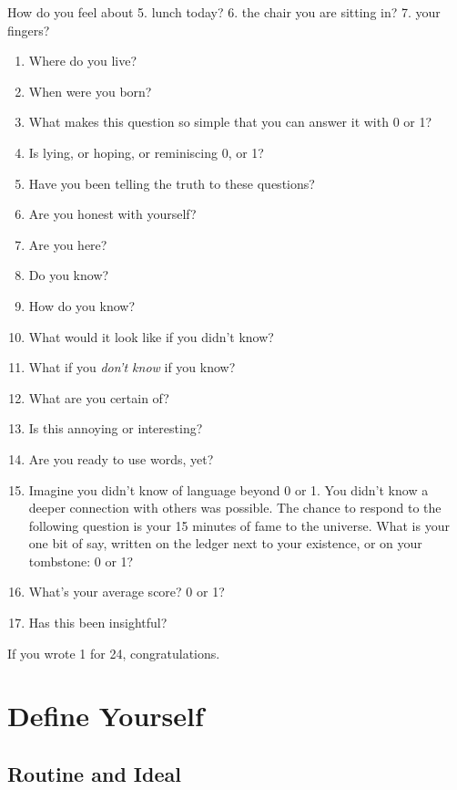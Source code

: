 \documentclass[
]{book}
\begin{document}
How do you feel about
5. lunch today?
6. the chair you are sitting in?
7. your fingers?

\begin{enumerate}
\def\labelenumi{\arabic{enumi}.}
\setcounter{enumi}{7}
\item
  Where do you live?
\item
  When were you born?
\item
  What makes this question so simple that you can answer it
  with 0 or 1?
\item
  Is lying, or hoping, or reminiscing 0, or 1?
\item
  Have you been telling the truth to these questions?
\item
  Are you honest with yourself?
\item
  Are you here?
\item
  Do you know?
\item
  How do you know?
\item
  What would it look like if you didn't know?
\item
  What if you \emph{don't know} if you know?
\item
  What are you certain of?
\item
  Is this annoying or interesting?
\item
  Are you ready to use words, yet?
\item
  Imagine you didn't know of language beyond 0 or 1.
  You didn't know a deeper connection with others was possible.
  The chance to respond to the following question is
  your 15 minutes of fame to the universe.
  What is your one bit of say,
  written on the ledger next to your existence, or
  on your tombstone: 0 or 1?
\item
  What's your average score? 0 or 1?
\item
  Has this been insightful?
\end{enumerate}

If you wrote 1 for 24, congratulations.

\hypertarget{define-yourself}{%
\chapter{Define Yourself}\label{define-yourself}}

\hypertarget{routine-and-ideal}{%
\section{Routine and Ideal}\label{routine-and-ideal}}
\end{document}
